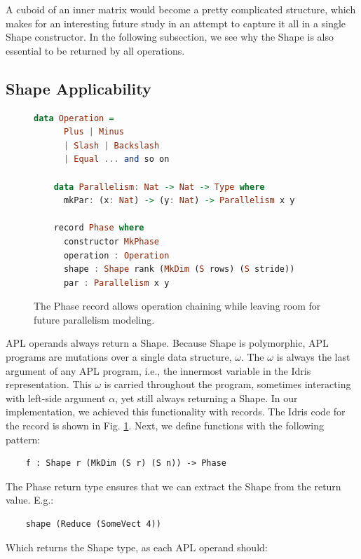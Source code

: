 \documentclass{report}
\begin{document}
A cuboid of an inner matrix would become a pretty complicated structure, which makes for an interesting future study in an attempt to capture it all in a single Shape constructor. In the following subsection, we see why the Shape is also essential to be returned by all operations.

\subsection{Shape Applicability}

\begin{figure}
\begin{lstlisting}[language=Haskell]
    data Operation =
      Plus | Minus
      | Slash | Backslash
      | Equal ... and so on
    
    data Parallelism: Nat -> Nat -> Type where
      mkPar: (x: Nat) -> (y: Nat) -> Parallelism x y
    
    record Phase where
      constructor MkPhase
      operation : Operation
      shape : Shape rank (MkDim (S rows) (S stride))
      par : Parallelism x y
\end{lstlisting}
\caption{The Phase record allows operation chaining while leaving room for future parallelism modeling.}
\label{fig:record}
\end{figure}

APL operands always return a Shape. Because Shape is polymorphic, APL programs are mutations over a single data structure, $\omega$. The $\omega$ is always the last argument of any APL program, i.e., the innermost variable in the Idris representation. This $\omega$ is carried throughout the program, sometimes interacting with left-side argument $\alpha$, yet still always returning a Shape. In our implementation, we achieved this functionality with records. The Idris code for the record is shown in Fig. \ref{fig:record}. Next, we define functions with the following pattern:

\begin{verbatim}
    f : Shape r (MkDim (S r) (S n)) -> Phase
\end{verbatim}

The Phase return type ensures that we can extract the Shape from the return value. E.g.:

\begin{verbatim}
    shape (Reduce (SomeVect 4))
\end{verbatim}

Which returns the Shape type, as each APL operand should:
\end{document}
